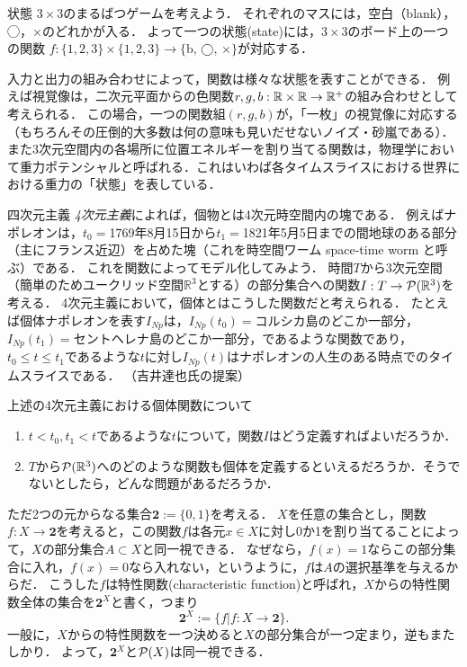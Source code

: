 \documentclass[dvipdfmx, 11pt,a4paper]{jsarticle}
\begin{document}
\begin{rei}{状態}{}
$3 \times 3$のまるばつゲームを考えよう．
それぞれのマスには，空白（blank），◯，×のどれかが入る．
よって一つの状態(state)には，$3 \times 3$のボード上の一つの関数 $f:\{1, 2, 3\} \times \{1, 2, 3\} \to \{ \text{b, ◯, ×}\}$が対応する．

入力と出力の組み合わせによって，関数は様々な状態を表すことができる．
例えば視覚像は，二次元平面からの色関数$r, g, b:\mathbb{R} \times \mathbb{R} \to \mathbb{R}^+$の組み合わせとして考えられる．
この場合，一つの関数組$(r,g,b)$が，「一枚」の視覚像に対応する（もちろんその圧倒的大多数は何の意味も見いだせないノイズ・砂嵐である）．
また3次元空間内の各場所に位置エネルギーを割り当てる関数は，物理学において重力ポテンシャルと呼ばれる．これはいわば各タイムスライスにおける世界における重力の「状態」を表している．
\end{rei}



\begin{rei}{四次元主義}{}
\emph{4次元主義}によれば，個物とは4次元時空間内の塊である．
例えばナポレオンは，$t_0=$1769年8月15日から$t_1=$1821年5月5日までの間地球のある部分（主にフランス近辺）を占めた塊（これを時空間ワーム space-time worm と呼ぶ）である．
これを関数によってモデル化してみよう．
時間$T$から3次元空間（簡単のためユークリッド空間$\mathbb{R}^3$とする）の部分集合への関数$I:T \to \mathcal{P}(\mathbb{R}^3)$を考える．
4次元主義において，個体とはこうした関数だと考えられる．
たとえば個体ナポレオンを表す$I_{Np}$は，$I_{Np}(t_0)=$コルシカ島のどこか一部分，$I_{Np}(t_1)=$セントヘレナ島のどこか一部分，であるような関数であり，$t_0 \leq t \leq t_1$であるような$t$に対し$I_{Np}(t)$はナポレオンの人生のある時点でのタイムスライスである．
（吉井達也氏の提案）
\end{rei}

\begin{renshu}{}{}
上述の4次元主義における個体関数について
 \begin{enumerate}
  \item $t < t_0, t_1 < t$であるような$t$について，関数$I$はどう定義すればよいだろうか．
  \item $T$から$\mathcal{P}(\mathbb{R}^3)$へのどのような関数も個体を定義するといえるだろうか．そうでないとしたら，どんな問題があるだろうか．
 \end{enumerate}
\end{renshu}


\begin{hatten}{}{}
ただ2つの元からなる集合$\mathbf{2} := \{0, 1\}$を考える．
$X$を任意の集合とし，関数$f:X \to \mathbf{2}$を考えると，この関数$f$は各元$x \in X$に対し0か1を割り当てることによって，$X$の部分集合$A \subset X$と同一視できる．
なぜなら，$f(x)=1$ならこの部分集合に入れ，$f(x)=0$なら入れない，というように，$f$は$A$の選択基準を与えるからだ．
こうした$f$は特性関数(characteristic function)と呼ばれ，$X$からの特性関数全体の集合を$\mathbf{2}^X$と書く，つまり
\[
 \mathbf{2}^X := \{ f|f:X \to \mathbf{2}\}.
\]
一般に，$X$からの特性関数を一つ決めると$X$の部分集合が一つ定まり，逆もまたしかり．
よって，$\mathbf{2}^X$と$\mathcal{P}(X)$は同一視できる．
\end{hatten}
\end{document}

